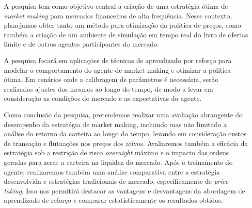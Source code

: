 A pesquisa tem como objetivo central a criação de uma estratégia ótima de \textit{market making} para mercados financeiros de alta frequência. Nesse contexto, planejamos obter tanto um método para otimização da política de preços, como também a criação de um ambiente de simulação em tempo real do livro de ofertas limite e de outros agentes participantes do mercado. 

A pesquisa focará em aplicações de técnicas de aprendizado por reforço para modelar o comportamento do agente de market making e otimizar a política ótima. Em cenários onde a calibragem de parâmetros é necessária, serão realizados ajustes dos mesmos ao longo do tempo, de modo a levar em consideração as condições do mercado e as expectativas do agente.

Como conclusão da pesquisa, pretendemos realizar uma avaliação abrangente do desempenho da estratégia de market making, incluindo mas não limitado a análise do retorno da carteira ao longo do tempo, levando em consideração custos de transação e flutuações nos preços dos ativos. Avaliaremos também a eficácia da estratégia sob a restrição de risco \textit{overnight} máximo e o impacto das ordens geradas para zerar a carteira na liquidez do mercado. Após o treinamento do agente, realizaremos também uma análise comparativa entre a estratégia desenvolvida e estratégias tradicionais de mercado, especificamente de \textit{price-taking}. Isso nos permitirá destacar as vantagens e desvantagens da abordagem de aprendizado de reforço e comparar estatisticamente os resultados obtidos.
